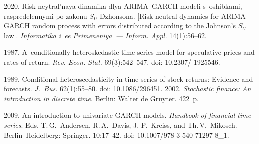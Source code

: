   \begin{multicols}{2}

\renewcommand{\bibname}{\protect\rmfamily References}

{\small\frenchspacing
 {%
 \begin{thebibliography}{99}
\vspace*{-4pt}

 2020. Risk-neytral'naya dinamika 
dlya ARIMA--GARCH modeli
s~oshib\-ka\-mi, raspredelennymi po zakonu $S_U$ 
Dzhonsona. [Risk-neutral dynamics for ARIMA--GARCH random process with errors 
distributed according to the Johnson's $S_U$ law]. \textit{Informatika i~ee 
Primeneniya~--- Inform. Appl.} 14(1):56--62.

 1987. A~conditionally heteroskedastic time series model for 
speculative prices and rates of return. \textit{Rev. Econ. Stat.} 69(3):542--547. doi: 
10.2307/ 1925546.
{

}
 1989. Conditional heteroscedasticity in time series of stock returns: 
Evidence and forecasts. \textit{J.~Bus.} 62(1):55--80. doi: 10.1086/296451.
 2002. \textit{Stochastic finance: An introduction in 
discrete time}. Berlin: Walter de Gruyter. 422~p.

 2009. An introduction to univariate GARCH models. 
\textit{Handbook of financial time series}. Eds. T.\,G.~Andersen, R.\,A.~Davis, 
J.-P.~Kreiss, and Th.\,V.~Mikosch. Berlin--Heidelberg: Springer. 10:17--42. doi:  
10.1007/978-3-540-71297-8\_1.


\end{thebibliography}}}
\end{multicols}
